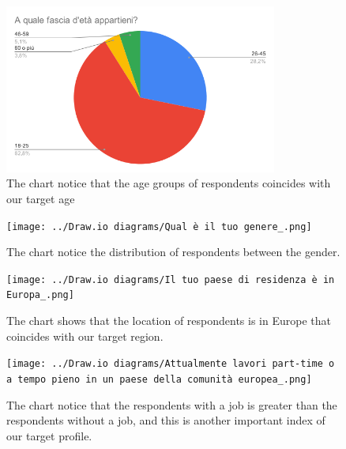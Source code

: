 \begin{figure}[htbp]
	\centering
	\includegraphics[width=0.8\textwidth]{../Draw.io diagrams/age_chart.png}  %
	\caption{The chart notice that the age groups of respondents coincides with our target age}
\end{figure}

\begin{figure}[htbp]
	\centering
	\texttt{[image: ../Draw.io diagrams/Qual è il tuo genere\_.png]}  %
	\caption{The chart notice the distribution of respondents between the gender.}
\end{figure}


\begin{figure}[htbp]
	\centering
	\texttt{[image: ../Draw.io diagrams/Il tuo paese di residenza è in Europa\_.png]}  %
	\caption{The chart shows that the location of respondents is in Europe that coincides with our target region.}
\end{figure}

\begin{figure}[htbp]
	\centering
	\texttt{[image: ../Draw.io diagrams/Attualmente lavori part-time o a tempo pieno in un paese della comunità europea\_.png]}  %
	\caption{The chart notice that the respondents with a job is greater than the respondents without a job, and this is another important index of our target profile.}
\end{figure}

